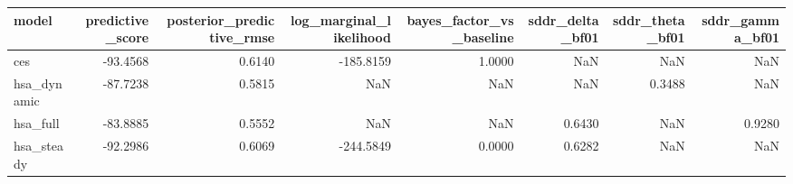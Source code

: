 \begin{tabular}{lrrrrrrr}
\toprule
model & predictive\_score & posterior\_predictive\_rmse & log\_marginal\_likelihood & bayes\_factor\_vs\_baseline & sddr\_delta\_bf01 & sddr\_theta\_bf01 & sddr\_gamma\_bf01 \\
\midrule
ces & -93.4568 & 0.6140 & -185.8159 & 1.0000 & NaN & NaN & NaN \\
hsa\_dynamic & -87.7238 & 0.5815 & NaN & NaN & NaN & 0.3488 & NaN \\
hsa\_full & -83.8885 & 0.5552 & NaN & NaN & 0.6430 & NaN & 0.9280 \\
hsa\_steady & -92.2986 & 0.6069 & -244.5849 & 0.0000 & 0.6282 & NaN & NaN \\
\bottomrule
\end{tabular}

